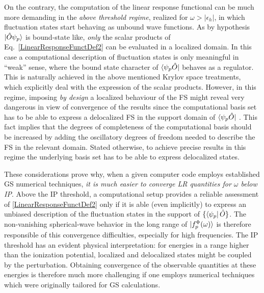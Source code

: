 \documentclass[reprint,aps,prb]{revtex4-1}
\newcommand{\eps}{\epsilon}
\newcommand{\op}[1]{\hat {#1}}
\begin{document}
On the contrary, the computation of the linear response functional can be much more demanding in the \emph{above threshold regime},
realized for $\omega>|\eps_h|$, in which fluctuation states start behaving as unbound wave functions.
As by hypothesis $\ket{\op O \psi_p}$ is bound-state like, \emph{only} the scalar products of Eq.~\eqref{LinearResponseFunctDef2}
can be evaluated in a localized domain. In this case a computational description of fluctuation states is only meaningful in ``weak''
sense, where the bound state character of $\bra{\psi_p\op O}$ behaves as a regulator. This is naturally achieved in the above mentioned
Krylov space treatments, which explicitly deal with the expression of the scalar products. However, in this regime, imposing \emph{by design}
a localized behaviour of the FS might reveal very dangerous in view of convergence of the results since the computational basis set has
to be able to express a delocalized FS in the support domain of $\bra{\psi_p\op O}$ .
This fact implies that the degrees of completeness of the computational basis should be increased by adding
the oscillatory degrees of freedom needed to describe the FS in the relevant domain.
Stated otherwise, to achieve precise results in this regime the
underlying basis set has to be able to express delocalized states.

These considerations prove why, when a given computer code employs established GS numerical techniques,
\emph{it is much easier to converge LR quantities for $\omega$ below IP}.
Above the IP threshold, a computational setup
provides a reliable assessment of \eqref{LinearResponseFunctDef2} only if it is able (even implicitly) to express an
unbiased description of the fluctuation states in the support of $\{\bra{\psi_p}\op O\}$.
The non-vanishing spherical-wave behavior in the long range of $\ket{f_p^\Phi(\omega)}$ is therefore responsible
of this convergence difficulties, especially for high frequencies.
The IP threshold has an evident physical interpretation: for energies in a range higher than the ionization potential,
localized and delocalized states might be coupled by the perturbation. Obtaining convergence of the observable quantities at these energies is therefore much more challenging if one employs
numerical techniques which were originally tailored for GS calculations.
\end{document}
